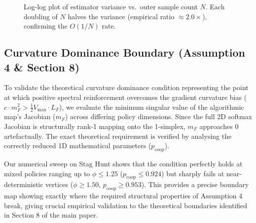 \documentclass[11pt,a4paper]{article}
\theoremstyle{remark}
\begin{document}
\begin{figure}[H]
\centering
{}
\caption{%
  Log-log plot of estimator variance vs.\ outer sample count $N$.
  Each doubling of $N$ halves the variance (empirical ratio
  $\approx 2.0\times$), confirming the $O(1/N)$ rate.
}
\label{fig:variance}
\end{figure}

\subsection{Curvature Dominance Boundary (Assumption 4 \& Section 8)}
\label{sec:assumption_5}

To validate the theoretical curvature dominance condition representing the point at which positive spectral reinforcement overcomes the gradient curvature bias ($c \cdot m_F^2 > \frac{1}{2} V_{\max} \cdot L_F$), we evaluate the minimum singular value of the algorithmic map's Jacobian ($m_F$) across differing policy dimensions. Since the full 2D softmax Jacobian is structurally rank-1 mapping onto the 1-simplex, $m_F$ approaches $0$ artefactually. The exact theoretical requirement is verified by analysing the correctly reduced 1D mathematical parameters ($p_{\mathrm{coop}}$).

Our numerical sweep on Stag Hunt shows that the condition perfectly holds at mixed policies ranging up to $\phi \le 1.25$ ($p_{\mathrm{coop}} \le 0.924$) but sharply fails at near-deterministic vertices ($\phi \ge 1.50$, $p_{\mathrm{coop}} \ge 0.953$). This provides a precise boundary map showing exactly where the required structural properties of Assumption 4 break, giving crucial empirical validation to the theoretical boundaries identified in Section 8 of the main paper.
\end{document}
